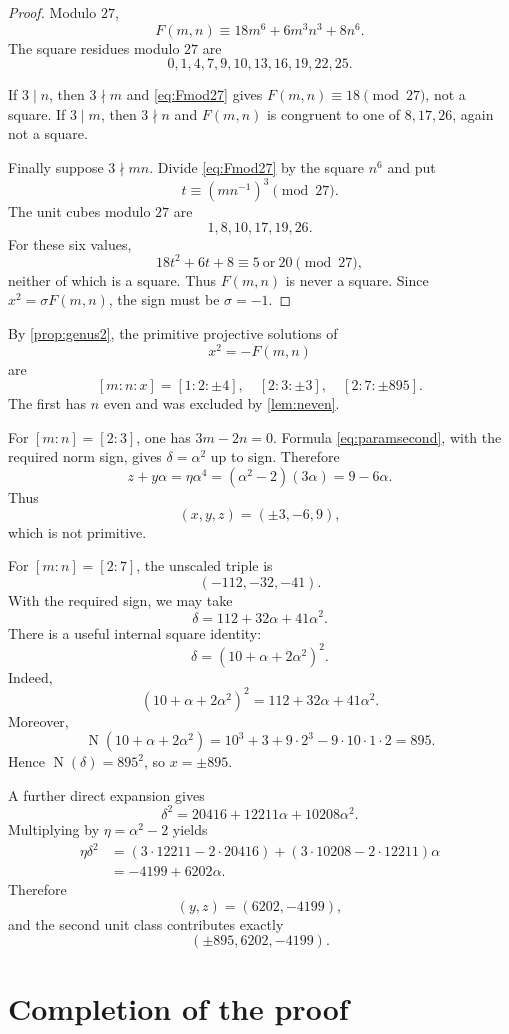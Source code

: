 \documentclass[11pt,a4paper]{article}
\newcommand{\Norm}{\operatorname{N}}
\newcommand{\etaunit}{\eta}
\begin{document}
\begin{proof}
Modulo $27$,
\begin{equation}\label{eq:Fmod27}
F(m,n)\equiv18m^6+6m^3n^3+8n^6.
\end{equation}
The square residues modulo $27$ are
\[
0,1,4,7,9,10,13,16,19,22,25.
\]

If $3\mid n$, then $3\nmid m$ and \eqref{eq:Fmod27} gives
$F(m,n)\equiv18\pmod{27}$, not a square.  If $3\mid m$, then $3\nmid n$
and $F(m,n)$ is congruent to one of $8,17,26$, again not a square.

Finally suppose $3\nmid mn$.  Divide \eqref{eq:Fmod27} by the square
$n^6$ and put
\[
t\equiv(mn^{-1})^3\pmod{27}.
\]
The unit cubes modulo $27$ are
\[
1,8,10,17,19,26.
\]
For these six values,
\[
18t^2+6t+8\equiv5\ \text{or}\ 20\pmod{27},
\]
neither of which is a square.  Thus $F(m,n)$ is never a square.  Since
$x^2=\sigma F(m,n)$, the sign must be $\sigma=-1$.
\end{proof}

By \cref{prop:genus2}, the primitive projective solutions of
\[
x^2=-F(m,n)
\]
are
\[
[m:n:x]=[1:2:\pm4],
\quad
[2:3:\pm3],
\quad
[2:7:\pm895].
\]
The first has $n$ even and was excluded by \cref{lem:neven}.

For $[m:n]=[2:3]$, one has $3m-2n=0$.  Formula
\eqref{eq:paramsecond}, with the required norm sign, gives
$\delta=\alpha^2$ up to sign.  Therefore
\[
z+y\alpha
 =\etaunit\alpha^4
 =(\alpha^2-2)(3\alpha)
 =9-6\alpha.
\]
Thus
\[
(x,y,z)=(\pm3,-6,9),
\]
which is not primitive.

For $[m:n]=[2:7]$, the unscaled triple is
\[
(-112,-32,-41).
\]
With the required sign, we may take
\[
\delta=112+32\alpha+41\alpha^2.
\]
There is a useful internal square identity:
\[
\delta=(10+\alpha+2\alpha^2)^2.
\]
Indeed,
\[
(10+\alpha+2\alpha^2)^2
 =112+32\alpha+41\alpha^2.
\]
Moreover,
\[
\Norm(10+\alpha+2\alpha^2)
 =10^3+3+9\cdot2^3-9\cdot10\cdot1\cdot2
 =895.
\]
Hence $\Norm(\delta)=895^2$, so $x=\pm895$.

A further direct expansion gives
\[
\delta^2=20416+12211\alpha+10208\alpha^2.
\]
Multiplying by $\etaunit=\alpha^2-2$ yields
\begin{align*}
\etaunit\delta^2
&=(3\cdot12211-2\cdot20416)
 +(3\cdot10208-2\cdot12211)\alpha\\
&=-4199+6202\alpha.
\end{align*}
Therefore
\[
(y,z)=(6202,-4199),
\]
and the second unit class contributes exactly
\[
(\pm895,6202,-4199).
\]

\section{Completion of the proof}
\end{document}
